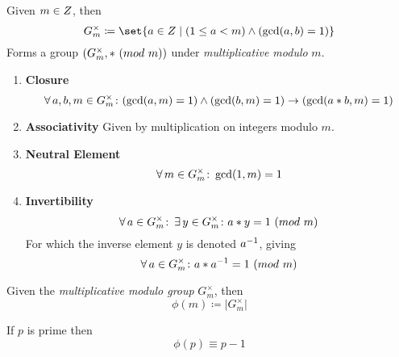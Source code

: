 \begin{definition}
    Given $m \in \relax{Z}$, then
    \begin{equation}
        G^{\times}_{m} \coloneqq \set{a \in \Int \mid (1 \le a < m) \land (\gcd(a, b) = 1)}
    \end{equation}
    Forms a group $\left( G^{\times}_{m}, \ast \ (\relax{mod}\ m) \right)$ under \textit{multiplicative modulo} $m$.
    
    \begin{enumerate}
        \item \textbf{Closure}
        \begin{equation}
            \operatorname{\forall} a, b, m \in G^{\times}_{m} \colon 
                (\gcd(a, m) = 1) \land (\gcd(b, m) = 1) \to (\gcd(a \ast b, m) = 1)
        \end{equation}
        \item \textbf{Associativity}
            \subitem Given by multiplication on integers modulo $m$.
        \item \textbf{Neutral Element}
        \begin{equation}
            \operatorname{\forall} m \in G^{\times}_{m} \colon \gcd(1, m) = 1
        \end{equation}
        \item \textbf{Invertibility}
        \begin{equation}
            \operatorname{\forall} a \in G^{\times}_{m} \colon \operatorname{\exists} y \in G^{\times}_{m} \colon a \ast y = 1 \ (\relax{mod}\ m)
        \end{equation}
        For which the inverse element $y$ is denoted ${a}^{-1}$, giving
        \begin{equation}
            \operatorname{\forall} a \in G^{\times}_{m} \colon a \ast {a}^{-1} = 1 \ (\relax{mod}\ m)
        \end{equation}
    \end{enumerate}
\end{definition}

\begin{theorem}
    Given the \textit{multiplicative modulo group} $G^{\times}_{m}$, then
    \begin{equation}
        \phi(m) \coloneqq \lvert G^{\times}_{m} \rvert
    \end{equation}
\end{theorem}

\begin{theorem}
    If $p$ is prime then
    \begin{equation}
        \phi(p) \equiv p - 1
    \end{equation}
\end{theorem}

